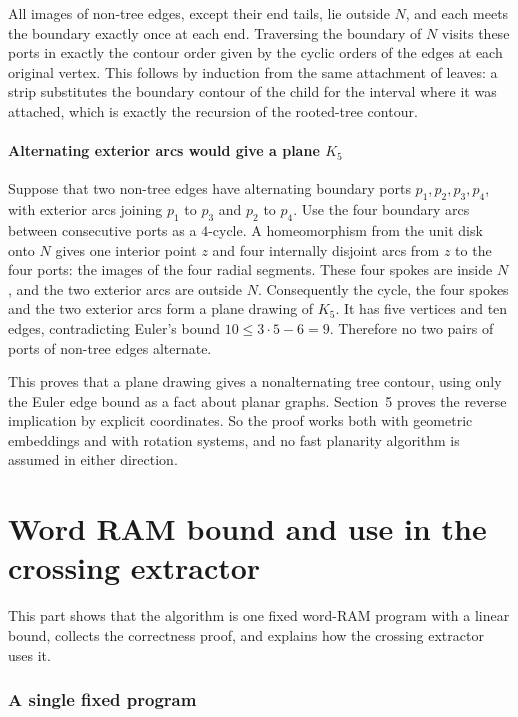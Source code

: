 \documentclass[11pt]{article}
\begin{document}
All images of non-tree edges, except their end tails, lie outside $N$, and each
meets the boundary exactly once at each end. Traversing the boundary of $N$
visits these ports in exactly the contour order given by the cyclic orders of
the edges at each original vertex. This follows by induction from the same
attachment of leaves: a strip substitutes the boundary contour of the child for
the interval where it was attached, which is exactly the recursion of the
rooted-tree contour.

\subsection{Alternating exterior arcs would give a plane \texorpdfstring{$K_5$}{K5}}\label{sec:k5}

Suppose that two non-tree edges have alternating boundary ports
$p_1,p_2,p_3,p_4$, with exterior arcs joining $p_1$ to $p_3$ and $p_2$ to
$p_4$. Use the four boundary arcs between consecutive ports as a $4$-cycle. A
homeomorphism from the unit disk onto $N$ gives one interior point $z$ and four
internally disjoint arcs from $z$ to the four ports: the images of the four
radial segments. These four spokes are inside $N$, and the two exterior arcs are
outside $N$. Consequently the cycle, the four spokes and the two exterior arcs
form a plane drawing of $K_5$. It has five vertices and ten edges,
contradicting Euler's bound $10\le3\cdot5-6=9$. Therefore no two pairs of
ports of non-tree edges alternate.

This proves that a plane drawing gives a nonalternating tree contour, using
only the Euler edge bound as a fact about planar graphs. Section~5 proves the
reverse implication by explicit coordinates. So the proof works both with
geometric embeddings and with rotation systems, and no fast planarity
algorithm is assumed in either direction.

\part{Word RAM bound and use in the crossing extractor}\label{part:v}

This part shows that the algorithm is one fixed word-RAM program with a linear
bound, collects the correctness proof, and explains how the crossing extractor
uses it.

\section{A single fixed program}
\end{document}
